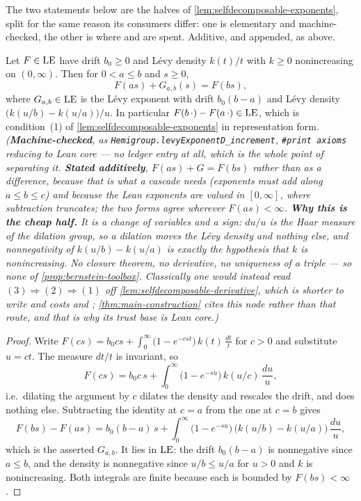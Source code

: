 \bigskip

The two statements below are the halves of \ref{lem:selfdecomposable-exponents}, split for the
same reason its consumers differ: one is elementary and machine-checked, the other is where
 and  are spent. Additive, and appended, as above.

\begin{lemma}\label{lem:selfdecomposable-increment}
\leanok
Let $F \in \mathrm{LE}$ have drift $b_0 \ge 0$ and Lévy density $k(t)/t$ with $k \ge 0$ nonincreasing on
$(0,\infty)$. Then for $0 < a \le b$ and $s \ge 0$,
\[
  F(a s) + G_{a,b}(s) = F(b s),
\]
where $G_{a,b} \in \mathrm{LE}$ is the Lévy exponent with drift $b_0(b-a)$ and Lévy density
$\bigl(k(u/b) - k(u/a)\bigr)/u$. In particular $F(b\,\cdot) - F(a\,\cdot) \in \mathrm{LE}$, which is
condition~(1) of \ref{lem:selfdecomposable-exponents} in representation form.
\statusT\quad\emph{(\textbf{Machine-checked}, as
\texttt{Hemigroup.levyExponentD\_increment}, \texttt{\#print axioms} reducing to Lean core ---
no ledger entry at all, which is the whole point of separating it. \textbf{Stated additively},
$F(as) + G = F(bs)$ rather than as a difference, because that is what a cascade needs
(exponents must \emph{add} along $a \le b \le c$) and because the Lean exponents are valued in
$[0,\infty]$, where subtraction truncates; the two forms agree wherever $F(as) < \infty$.
\textbf{Why this is the cheap half.} It is a change of variables and a sign: $du/u$ is the Haar
measure of the dilation group, so a dilation moves the Lévy density and nothing else, and
nonnegativity of $k(u/b) - k(u/a)$ is exactly the hypothesis that $k$ is nonincreasing. No
closure theorem, no derivative, no uniqueness of a triple --- so none of
\ref{prop:bernstein-toolbox}. Classically one would instead read $(3) \Rightarrow (2)
\Rightarrow (1)$ off \ref{lem:selfdecomposable-derivative}, which is shorter to write and costs
 and ; \ref{thm:main-construction} cites this node rather than that route,
and that is why its trust base is Lean core.)}
\end{lemma}

\begin{proof}
\leanok
Write $F(cs) = b_0 c s + \int_0^\infty \bigl(1 - e^{-cst}\bigr)\,k(t)\,\frac{dt}{t}$ for $c > 0$
and substitute $u = ct$. The measure $dt/t$ is invariant, so
\[
  F(cs) = b_0 c\, s + \int_0^\infty \bigl(1 - e^{-su}\bigr)\, k(u/c)\,\frac{du}{u} ,
\]
i.e.\ dilating the argument by $c$ dilates the density and rescales the drift, and does nothing
else. Subtracting the identity at $c = a$ from the one at $c = b$ gives
\[
  F(bs) - F(as) = b_0 (b-a)\, s
    + \int_0^\infty \bigl(1 - e^{-su}\bigr)\,\bigl(k(u/b) - k(u/a)\bigr)\,\frac{du}{u},
\]
which is the asserted $G_{a,b}$. It lies in $\mathrm{LE}$: the drift $b_0(b-a)$ is nonnegative since
$a \le b$, and the density is nonnegative since $u/b \le u/a$ for $u > 0$ and $k$ is
nonincreasing. Both integrals are finite because each is bounded by $F(bs) < \infty$.
\end{proof}

